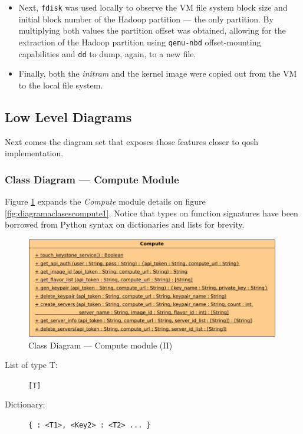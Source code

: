 \begin{itemize}
 \item Next, \texttt{fdisk} was used locally to observe the VM file system block size and initial block number of the Hadoop partition --- the only partition. By multiplying both values the partition offset was obtained, allowing for the extraction of the Hadoop partition using \texttt{qemu-nbd} offset-mounting capabilities and \texttt{dd} to dump, again, to a new file.
 \item Finally, both the \emph{initram} and the kernel image were copied out from the VM to the local file system.
\end{itemize}

\subsection{Low Level Diagrams}\label{subsec:diagramasimpl}
\noindent Next comes the diagram set that exposes those features closer to qosh implementation.

\subsubsection{Class Diagram --- Compute Module}\label{subsubsec:implementacioncompute}
\noindent Figure \ref{fig:diagramaclasescompute2} expands the \emph{Compute} module details on figure \ref{fig:diagramaclasescompute1}. Notice that types on function signatures have been borrowed from Python syntax on dictionaries and lists for brevity.

\begin{figure}[tbp]
\begin{center}
\includegraphics[width=0.99\textwidth]{imagenes/028.pdf}
 \caption{Class Diagram --- Compute module (II)}
\label{fig:diagramaclasescompute2}
\end{center}
\end{figure}

\begin{description}
 \item[List of type T:] \texttt{[T]}
 \item[Dictionary:] \texttt{\{<Key1> : <T1>, <Key2> : <T2> ... \}}
\end{description}


